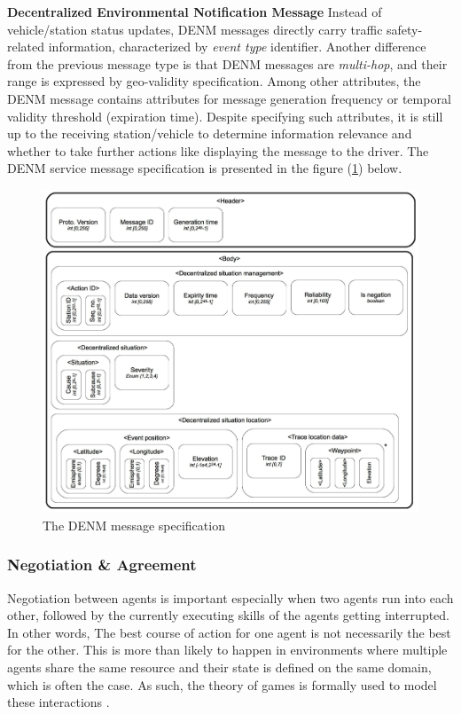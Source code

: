 \documentclass[main.tex]{subfiles}
\begin{document}
\textbf{Decentralized Environmental Notification Message}\smallskip\newline
Instead of vehicle/station status updates, DENM messages directly carry traffic safety-related 
information, characterized by \emph{event type} identifier. Another difference from the previous 
message type is that DENM messages are \emph{multi-hop}, and their range is expressed by geo-validity 
specification. Among other attributes, the DENM message contains attributes for message generation 
frequency or temporal validity threshold (expiration time). Despite specifying such 
attributes, it is still up to the receiving station/vehicle to determine information relevance
\cite{ETSI2019} and whether to take further actions like displaying the message to the driver.
The DENM service message specification is presented in the figure (\ref{denm-spec}) below.

\begin{figure}[htbp]
    \centering
    \includegraphics[width=.9\textwidth]{denm-spec.png}
    \caption{The DENM message specification \cite{Santa2013}}
    \label{denm-spec}
\end{figure}

\subsubsection{Negotiation \& Agreement}

Negotiation between agents is important especially when two agents run into each other, 
followed by the currently executing skills of the agents getting interrupted. In other words, 
The best course of action for one agent is not necessarily the best for the other. This is more than
likely to happen in environments where multiple agents share the same resource and their state
is defined on the same domain, which is often the case. As such, the theory of games is formally 
used to model these interactions \cite{Binder2022}. 
\end{document}

